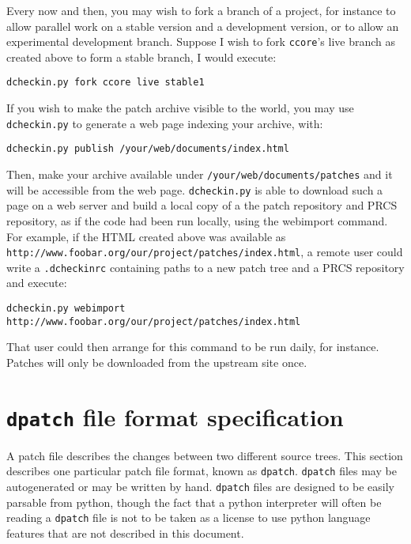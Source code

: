 \documentclass{article}
\begin{document}
Every now and then, you may wish to fork a branch of a project, for
instance to allow parallel work on a stable version and a development
version, or to allow an experimental development branch. Suppose I
wish to fork \texttt{ccore}'s live branch as created above to form a stable
branch, I would execute:

\begin{verbatim}
dcheckin.py fork ccore live stable1
\end{verbatim}

If you wish to make the patch archive visible to the world, you may
use \texttt{dcheckin.py} to generate a web page indexing your
archive, with:

\begin{verbatim}
dcheckin.py publish /your/web/documents/index.html
\end{verbatim}

Then, make your archive available under
\texttt{/your/web/documents/patches} and it will be accessible from
the web page. \texttt{dcheckin.py} is able to
download such a page on a web server and build a local copy of a the
patch repository and PRCS repository, as if the code had been run
locally, using the webimport command. For example, if the HTML created
above was available as
\texttt{http://www.foobar.org/our/project/patches/index.html}, a
remote user could write a \texttt{.dcheckinrc} containing paths to a
new patch tree and a PRCS repository and execute:

\begin{verbatim}
dcheckin.py webimport http://www.foobar.org/our/project/patches/index.html
\end{verbatim}

That user could then arrange for this command to be run daily, for
instance. Patches will only be downloaded from the upstream site once.

\section{\texttt{dpatch} file format specification}

A patch file describes the changes between two different source
trees. This section describes one particular patch file format, known
as \texttt{dpatch}. \texttt{dpatch} files may be autogenerated or may
be written by hand. \texttt{dpatch} files are designed to be easily
parsable from python, though the fact that a python interpreter will
often be reading a \texttt{dpatch} file is not to be taken as a license to use
python language features that are not described in this document.
\end{document}
